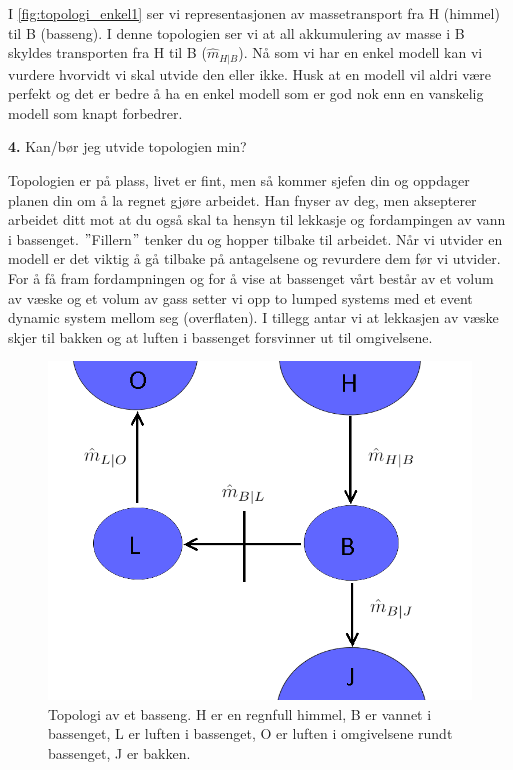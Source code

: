 I \cref{fig:topologi_enkel1} ser vi representasjonen av massetransport fra H (himmel) til B (basseng). I denne topologien ser vi at all akkumulering av masse i B skyldes transporten fra H til B ($\hat{m}_{H|B}$). Nå som vi har en enkel modell kan vi vurdere hvorvidt vi skal utvide den eller ikke. Husk at en modell vil aldri være perfekt og det er bedre å ha en enkel modell som er god nok enn en vanskelig  modell som knapt forbedrer.  

\begin{center}
    \textbf{4.} Kan/bør jeg utvide topologien min?
\end{center}

 Topologien er på plass, livet er fint, men så kommer sjefen din og oppdager planen din om å la regnet gjøre arbeidet. Han fnyser av deg, men aksepterer  arbeidet ditt mot at du også skal ta hensyn til lekkasje og fordampingen av vann i bassenget. $"$Fillern$"$ tenker du og hopper tilbake til arbeidet. Når vi utvider en modell er det viktig å gå tilbake på antagelsene og revurdere dem før vi utvider. For å få fram fordampningen og for å vise at bassenget vårt består av et volum av væske og et volum av gass setter vi opp to lumped systems med et event dynamic system mellom seg (overflaten). I tillegg antar vi at lekkasjen av væske skjer til bakken og at luften i bassenget forsvinner ut til omgivelsene.  
 
 \begin{figure}[H]
     \centering
     \includegraphics[scale=0.3]{Figures/Basseng2.png}
     \caption{Topologi av et basseng. H er en regnfull himmel, B er vannet i bassenget, L er luften i bassenget, O er luften i omgivelsene rundt bassenget, J er bakken.}
     \label{fig:basseng_vanskelig}
 \end{figure}

